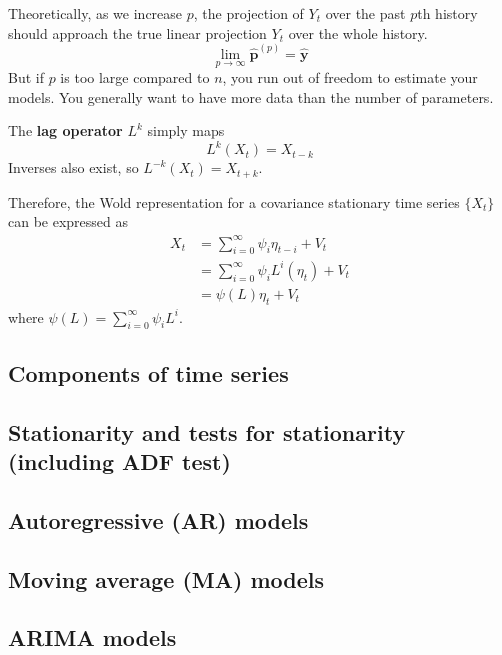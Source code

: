 \documentclass{article}
\begin{document}
    Theoretically, as we increase $p$, the projection of $Y_t$ over the past $p$th history should approach the true linear projection $Y_t$ over the whole history. 
    \begin{equation}
      \lim_{p \rightarrow \infty} \hat{\mathbf{p}}^{(p)} = \hat{\mathbf{y}}
    \end{equation}
    But if $p$ is too large compared to $n$, you run out of freedom to estimate your models. You generally want to have more data than the number of parameters. 

    \begin{definition}
      The \textbf{lag operator} $L^k$ simply maps 
      \begin{equation}
        L^k (X_t)= X_{t-k}
      \end{equation}
      Inverses also exist, so $L^{-k} (X_t) = X_{t+k}$. 
    \end{definition}

    Therefore, the Wold representation for a covariance stationary time series $\{X_t\}$ can be expressed as 
    \begin{align}
      X_t & = \sum_{i=0}^\infty \psi_i \eta_{t-i} + V_t \\
          & = \sum_{i=0}^\infty \psi_i L^i (\eta_{t}) + V_t \\
          & = \psi(L) \eta_t + V_t 
    \end{align}
    where $\psi(L) = \sum_{i=0}^\infty \psi_i L^i$. 

  \subsection{Components of time series}

  \subsection{Stationarity and tests for stationarity (including ADF test)}

  \subsection{Autoregressive (AR) models}

  \subsection{Moving average (MA) models}

  \subsection{ARIMA models}
\end{document}

